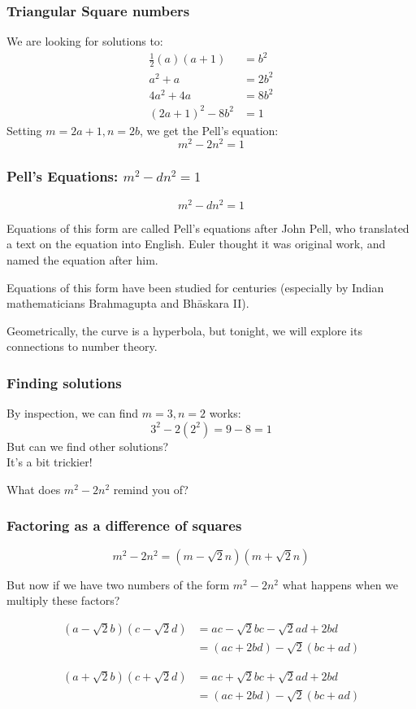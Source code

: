 \documentclass[t]{beamer}
\begin{document}
\begin{frame}
        \frametitle{Triangular Square numbers}
	We are looking for solutions to:
	\begin{align*}
		\frac{1}{2}(a)(a+1) &= b^2 \\
		a^2 + a &= 2b^2 \\
		4a^2 + 4a &= 8b^2 \\
		(2a+1)^2 - 8b^2 &= 1
	\end{align*}
	Setting $m=2a+1, n=2b$, we get the Pell's equation:
	\[ m^2 - 2n^2 = 1 \]
\end{frame}

\begin{frame}
        \frametitle{Pell's Equations: $m^2 - dn^2 = 1$}
	\[ m^2 - dn^2 = 1 \]

	Equations of this form are called Pell's equations after John Pell, who
	translated a text on the equation into English. Euler thought it was
	original work, and named the equation after him.

	\vspace{1em}Equations of this form have been studied for centuries (especially by
	Indian mathematicians Brahmagupta and Bh\=askara II).

	\vspace{1em}Geometrically, the curve is a hyperbola, but tonight, we will 
	explore its connections to number theory.
\end{frame}


\begin{frame}
	\frametitle{Finding solutions}

	By inspection, we can find $m=3, n=2$ works:
	\[ 3^2 - 2(2^2) = 9 - 8 = 1 \]
	But can we find other solutions?\\
	It's a bit trickier!

	\vspace{2em}

	What does $m^2 - 2n^2$ remind you of?
\end{frame}

\begin{frame}
	\frametitle{Factoring as a difference of squares}

	\[ m^2 - 2n^2 = (m-\sqrt{2}n)(m+\sqrt{2}n) \]

	But now if we have two numbers of the form $m^2-2n^2$ what happens
	when we multiply these factors?

	\begin{align*}
		(a-\sqrt{2}b)(c-\sqrt{2}d) &= ac - \sqrt{2}bc - \sqrt{2}ad + 2bd \\
		&= (ac+2bd)-\sqrt{2}(bc+ad)
	\end{align*}

	\begin{align*}
		(a+\sqrt{2}b)(c+\sqrt{2}d) &= ac + \sqrt{2}bc + \sqrt{2}ad + 2bd \\
		&= (ac+2bd)-\sqrt{2}(bc+ad)
	\end{align*}


\end{frame}
\end{document}
